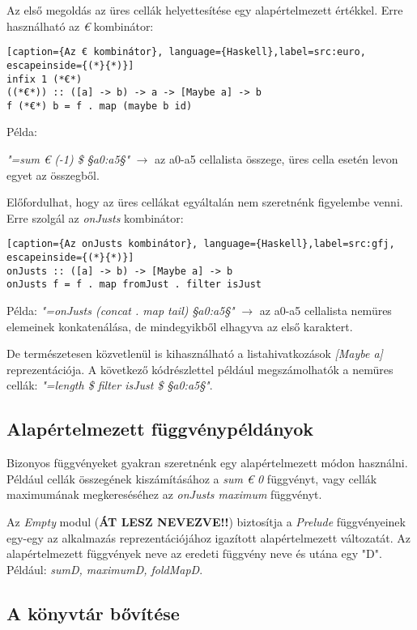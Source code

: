 Az első megoldás az üres cellák helyettesítése egy alapértelmezett értékkel. Erre használható az \textit{€} kombinátor:

\begin{lstlisting}[caption={Az € kombinátor}, language={Haskell},label=src:euro, escapeinside={(*}{*)}]
infix 1 (*€*)
((*€*)) :: ([a] -> b) -> a -> [Maybe a] -> b
f (*€*) b = f . map (maybe b id)
\end{lstlisting}

Példa:

\textit{"=sum € (-1) \$ §a0:a5§"} $\rightarrow$ az a0-a5 cellalista összege, üres cella esetén levon egyet az összegből.

Előfordulhat, hogy az üres cellákat egyáltalán nem szeretnénk figyelembe venni. Erre szolgál az \textit{onJusts} kombinátor:

\begin{lstlisting}[caption={Az onJusts kombinátor}, language={Haskell},label=src:gfj, escapeinside={(*}{*)}]
onJusts :: ([a] -> b) -> [Maybe a] -> b
onJusts f = f . map fromJust . filter isJust 
\end{lstlisting}

Példa:
\textit{"=onJusts (concat . map tail) §a0:a5§"} $\rightarrow$ az a0-a5 cellalista nemüres elemeinek konkatenálása, de mindegyikből elhagyva az első karaktert.

De természetesen közvetlenül is kihasználható a listahivatkozások \textit{[Maybe a]} reprezentációja. A következő kódrészlettel például megszámolhatók a nemüres cellák: \textit{"=length \$ filter isJust \$ §a0:a5§"}.

\subsection{Alapértelmezett függvénypéldányok}

Bizonyos függvényeket gyakran szeretnénk egy alapértelmezett módon használni. Például cellák összegének kiszámításához a \textit{sum € 0} függvényt, vagy cellák maximumának megkereséséhez az \textit{onJusts maximum} függvényt.

Az \textit{Empty} modul (\textbf{ÁT LESZ NEVEZVE!!}) biztosítja a \textit{Prelude} függvényeinek egy-egy az alkalmazás reprezentációjához igazított alapértelmezett változatát. Az alapértelmezett függvények neve az eredeti függvény neve és utána egy "D". Például: \textit{sumD, maximumD, foldMapD}.

\subsection{A könyvtár bővítése}

